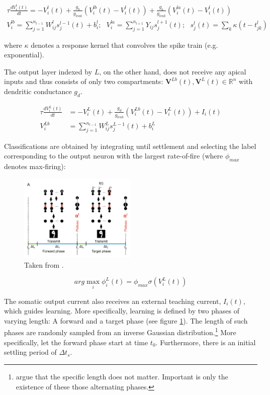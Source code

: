 \documentclass[colorinlistoftodos]{article}
\theoremstyle{definition}
\def\R{\mathbb{R}}
\begin{document}
	\begin{align*}
		\tau \frac{dV_i^l(t)}{dt} = -V_i^l(t) + \frac{g_b}{g_{leak}}\left(V_i^{lb}(t) - V_i^l(t)\right) +\frac{g_a}{g_{leak}}\left(V_i^{la}(t) - V_i^l(t)\right)\\
		V_i^{lb} = \sum_{j=1}^{n_{l-1}} W_{ij}^l s_j^{l-1}(t) + b_i^l; \ \ \ V_i^{la} = \sum_{j=1}^{n_{l+1}} Y_{ij} s^{l+1}_j(t); \ \ \
		s_j^{l}(t) = \sum_k \kappa(t-t_{jk}^{l})
	\end{align*}

where $\kappa$ denotes a response kernel that convolves the spike train (e.g. exponential).
	
The output layer indexed by $L$, on the other hand, does not receive any apical inputs and thus consists of only two compartments: $\mathbf{V}^{Lb}(t), \mathbf{V}^{L}(t) \in \R^n$ with dendritic conductance $g_d$. 

\begin{align*}
		\tau \frac{dV_i^L(t)}{dt} &= -V_i^L(t) + \frac{g_d}{g_{leak}}\left(V_i^{Lb}(t) - V_i^L(t) \right) + I_i(t)\\
		V_i^{Lb} &= \sum_{j=1}^{n_{l-1}} W_{ij}^L s_j^{L-1}(t) + b_i^L
\end{align*}

Classifications are obtained by integrating until settlement and selecting the label corresponding to the output neuron with the largest rate-of-fire (where $\phi_{max}$ denotes max-firing):
	
\begin{figure}
\centering
\includegraphics[width=0.5\textwidth]{../figures/report/phases}
\caption{\label{fig:phases} Taken from \citet{guerguiev2017}.}
\end{figure}

$$arg\max_i \phi^L_i(t) = \phi_{max} \sigma(V_i^L(t))$$

The somatic output current also receives an external teaching current, $I_i(t)$, which guides learning. More specifically, learning is defined by two phases of varying length: A forward and a target phase (see figure \ref{fig:phases}). The length of such phases are randomly sampled from an inverse Gaussian distribution.\footnote{\citet{guerguiev2017} argue that the specific length does not matter. Important is only the existence of these those alternating phases.}
More specifically, let the forward phase start at time $t_0$. Furthermore, there is an initial settling period of $\Delta t_s$.
 
\end{document}

